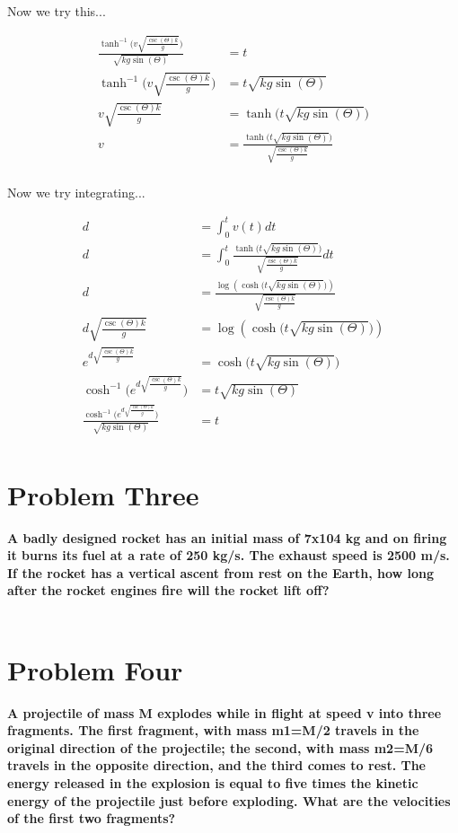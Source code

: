 \documentclass[10pt]{article} %
\begin{document}
Now we try this...

\begin{align*}
  \frac{\tanh^{-1}\Bigg(v\sqrt{\frac{\csc(\Theta)k}{g}}\Bigg)}{\sqrt{kg\sin(\Theta)}} &= t\\
  \tanh^{-1}\Bigg(v\sqrt{\frac{\csc(\Theta)k}{g}}\Bigg) &= t\sqrt{kg\sin(\Theta)}\\
  v\sqrt{\frac{\csc(\Theta)k}{g}} &= \tanh\Big(t\sqrt{kg\sin(\Theta)}\Big)\\
  v &= \frac{\tanh\Big(t\sqrt{kg\sin(\Theta)}\Big)}{\sqrt{\frac{\csc(\Theta)k}{g}}}\\    
\end{align*}

Now we try integrating...

\begin{align*}
  d &= \int_0^t v(t) dt\\
  d &= \int_0^t \frac{\tanh\Big(t\sqrt{kg\sin(\Theta)}\Big)}{\sqrt{\frac{\csc(\Theta)k}{g}}} dt\\
  d &= \frac{\log(\cosh\Big(t\sqrt{kg\sin(\Theta)}\Big))}{\sqrt{\frac{\csc(\Theta)k}{g}}}\\
  d\sqrt{\frac{\csc(\Theta)k}{g}} &= \log(\cosh\Big(t\sqrt{kg\sin(\Theta)}\Big))\\
  e^{d\sqrt{\frac{\csc(\Theta)k}{g}}} &= \cosh\Big(t\sqrt{kg\sin(\Theta)}\Big)\\
  \cosh^{-1}\Bigg(e^{d\sqrt{\frac{\csc(\Theta)k}{g}}}) &= t\sqrt{kg\sin(\Theta)}\\
  \frac{\cosh^{-1}\Big(e^{d\sqrt{\frac{\csc(\Theta)k}{g}}}\Big)}{\sqrt{kg\sin(\Theta)}} &= t\\        
\end{align*}



\vspace{1 cm}

\section{Problem Three}
\textbf{A badly designed rocket has an initial mass of 7x104 kg and on firing it burns its fuel at a rate of 250 kg/s. The exhaust speed is 2500 m/s. If the rocket has a vertical ascent from rest on the Earth, how long after the rocket engines fire will the rocket lift off?} \\ \\
\vspace{1 cm}

\section{Problem Four}
\textbf{A projectile of mass M explodes while in flight at speed v into three fragments. The first fragment, with mass m1=M/2 travels in the original direction of the projectile; the second, with mass m2=M/6 travels in the opposite direction, and the third comes to rest. The energy released in the explosion is equal to five times the kinetic energy of the projectile just before exploding. What are the velocities of the first two fragments?} \\ \\
\vspace{1 cm}
\end{document}
